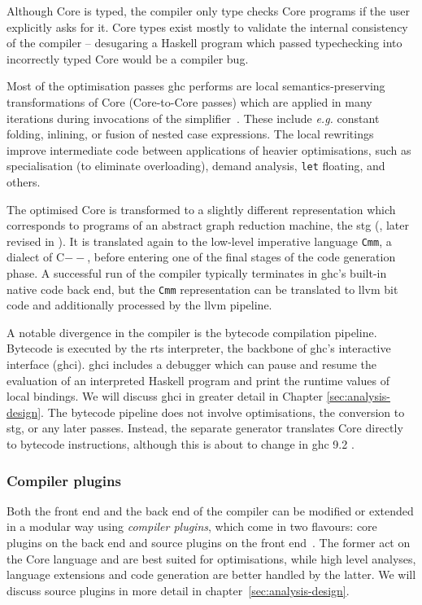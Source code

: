 \documentclass[thesis=B,english]{FITthesis}[2019/12/23]
\newcommand{\eg}{\emph{e.g.}\xspace}
\newcommand{\hsCode}[1]{\texttt{#1}}
\begin{document}
Although Core is typed, the compiler only type checks Core programs if the user
explicitly asks for it. Core types exist mostly to validate the internal
consistency of the compiler -- desugaring a Haskell program which passed
typechecking into incorrectly typed Core would be a compiler bug.

Most of the optimisation passes \acrshort{ghc} performs are local
semantics-pre\-serv\-ing transformations of Core (Core-to-Core passes) which
are applied in many iterations during invocations of the
simplifier~\cite{cmtary-core2core}. These include \eg constant folding,
inlining, or fusion of nested case expressions. The local rewritings improve
intermediate code between applications of heavier optimisations, such as
specialisation (to eliminate overloading), demand analysis, \hsCode{let}
floating, and others.

The optimised Core is transformed to a slightly different representation which
corresponds to programs of an abstract graph reduction machine, the
\acrfull{stg} (\cite{stg-classic}, later revised in \cite{stg2}). It is
translated again to the low-level imperative language \texttt{Cmm}, a dialect
of C$--$, before entering one of the final stages of the code generation phase.
A successful run of the compiler typically terminates in \acrshort{ghc}'s
built-in native code back end, but the \texttt{Cmm} representation can be
translated to \acrshort{llvm} bit code and additionally processed by the
\acrshort{llvm} pipeline.

A notable divergence in the compiler is the bytecode compilation pipeline.
Bytecode is executed by the \acrshort{rts} interpreter, the backbone of
\acrshort{ghc}'s interactive interface (\acrshort{ghci}). \acrshort{ghci}
includes a debugger which can pause and resume the evaluation of an interpreted
Haskell program and print the runtime values of local bindings. We will discuss
\acrshort{ghci} in greater detail in Chapter \ref{sec:analysis-design}. The
bytecode pipeline does not involve optimisations, the conversion to
\acrshort{stg}, or any later passes. Instead, the separate generator translates
Core directly to bytecode instructions, although this is about to change in
\acrshort{ghc} 9.2 \cite{mr-ghci-stg-unboxed}.

\subsubsection*{Compiler plugins}
Both the front end and the back end of the compiler can be modified or extended
in a modular way using \textit{compiler plugins}, which come in two flavours:
core plugins on the back end and source plugins on the front
end~\cite{ghc-source-plugins}. The former act on the Core language and are best
suited for optimisations, while high level analyses, language extensions and
code generation are better handled by the latter. We will discuss source
plugins in more detail in chapter~\ref{sec:analysis-design}.
\end{document}
